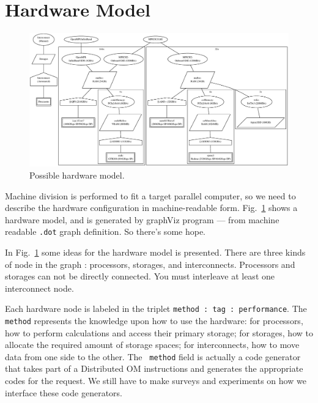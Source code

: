 \documentclass[twocolumn]{article}
\begin{document}
\section{Hardware Model}
\label{SectionHardware}

\begin{figure}
  \begin{center}
    \includegraphics[scale=0.3]{figure/hardware_graph.eps}
  \end{center}
  \caption{Possible hardware model.}\label{FigureHardware}
\end{figure}

Machine division is performed to fit a target parallel computer, so we
need to describe the hardware configuration in machine-readable form.
Fig.~\ref{FigureHardware} shows a hardware model, and is generated by
graphViz program --- from machine readable {\tt .dot} graph
definition. So there's some hope. 

In Fig.~\ref{FigureHardware} some ideas for the hardware model is
presented. There are three kinds of node in the graph : processors, storages,
and interconnects. Processors and storages can not be directly connected. You
must interleave at least one interconnect node.

Each hardware node is labeled in the triplet {\tt method : tag :
  performance}. The {\tt method} represents the knowledge upon how to use the
hardware: for processors, how to perform calculations and access their primary
storage; for storages, how to allocate the required amount of storage spaces;
for interconnects, how to move data from one side to the other. The {\tt
  method} field is actually a code generator that takes part of a Distributed
OM instructions and generates the appropriate codes for the request. We still
have to make surveys and experiments on how we interface these code
generators.
\end{document}
